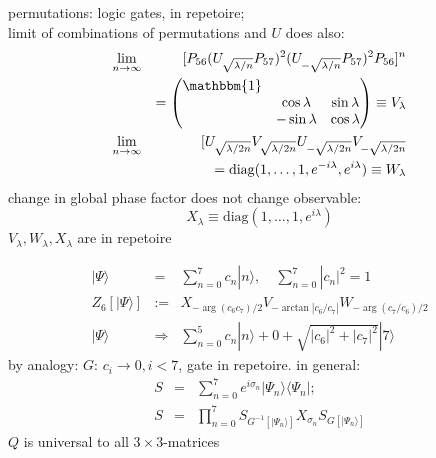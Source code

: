 \documentclass{beamer}
\begin{document}
\begin{frame}
    permutations: logic gates, in repetoire;\\
    limit of combinations of permutations and $U$ does also:
    \begin{eqnarray*}
        \lim_{n\to\infty}&&[P_{56}(U_{\sqrt{\lambda/n}}P_{57})^2(U_{-\sqrt{\lambda/n}}P_{57})^2P_{56}]^n\\
        &&=\begin{pmatrix}\mathbbm{1}&&\\&\cos\lambda&\sin\lambda\\&-\sin\lambda&\cos\lambda\end{pmatrix}\equiv V_\lambda\\
        \lim_{n\to\infty}&&[U_{\sqrt{\lambda/2n}}V_{\sqrt{\lambda/2n}}U_{-\sqrt{\lambda/2n}}V_{-\sqrt{\lambda/2n}}\\
        &&=\textrm{diag}(1,\ldots,1,e^{-i\lambda},e^{i\lambda})\equiv
        W_\lambda
    \end{eqnarray*}
    change in global phase factor does not change observable:
    \begin{equation*}
        X_\lambda\equiv\textrm{diag}(1,\ldots,1,e^{i\lambda})
    \end{equation*}
    $V_\lambda,W_\lambda,X_\lambda$ are in repetoire
\end{frame}
\begin{frame}
    \begin{eqnarray*}
     \nonumber |\Psi\rangle&=&\sum_{n=0}^7c_n|n\rangle,\quad\sum_{n=0}^7|c_n|^2=1\\
     Z_6[|\Psi\rangle]&:=&X_{-\arg(c_6c_7)/2}V_{-\arctan|c_6/c_7|}W_{-\arg(c_7/c_6)/2}\\
     |\Psi\rangle&\Rightarrow&\sum_{n=0}^5c_n|n\rangle+0+\sqrt{|c_6|^2+|c_7|^2}|7\rangle
    \end{eqnarray*}
	by analogy: $G:\,c_i\to0,i<7$, gate in repetoire. in general:
	\begin{eqnarray*}
	 S&=&\sum_{n=0}^7e^{i\sigma_n}|\Psi_n\rangle\langle\Psi_n|;\\
	 S&=&\prod_{n=0}^7S_{G^{-1}[|\Psi_n\rangle]}X_{\sigma_n}S_{G[|\Psi_n\rangle]}
	\end{eqnarray*}
	$Q$ is universal to all $3\times3$-matrices
\end{frame}
\end{document}
